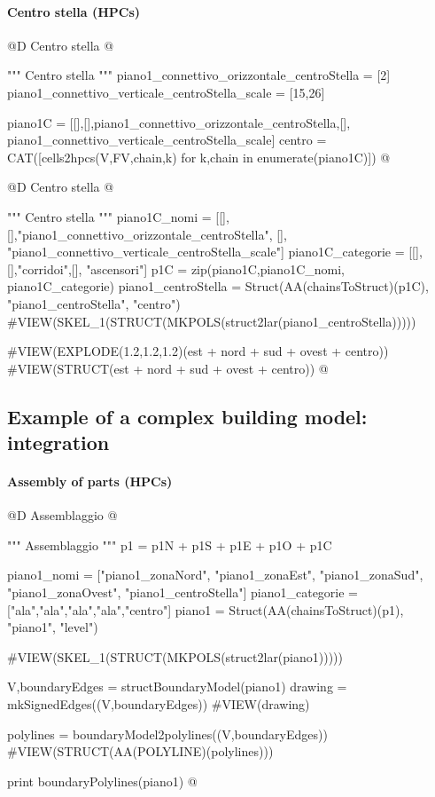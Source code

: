 \documentclass[11pt,oneside]{article}    %
\begin{document}
\paragraph{Centro stella (HPCs)}
@D Centro stella
@{""" Centro stella """
piano1_connettivo_orizzontale_centroStella = [2]
piano1_connettivo_verticale_centroStella_scale = [15,26]

piano1C = [[],[],piano1_connettivo_orizzontale_centroStella,[], piano1_connettivo_verticale_centroStella_scale]
centro = CAT([cells2hpcs(V,FV,chain,k) for k,chain in enumerate(piano1C)])
@}

@D Centro stella
@{""" Centro stella """
piano1C_nomi = [[],[],"piano1_connettivo_orizzontale_centroStella", [], "piano1_connettivo_verticale_centroStella_scale"]
piano1C_categorie = [[],[],"corridoi",[], "ascensori"]
p1C = zip(piano1C,piano1C_nomi, piano1C_categorie)
piano1_centroStella = Struct(AA(chainsToStruct)(p1C), "piano1_centroStella", "centro")
#VIEW(SKEL_1(STRUCT(MKPOLS(struct2lar(piano1_centroStella)))))

#VIEW(EXPLODE(1.2,1.2,1.2)(est + nord + sud + ovest + centro))
#VIEW(STRUCT(est + nord + sud + ovest + centro))
@}


\subsection{Example of a complex building model: integration}

\paragraph{Assembly of parts (HPCs)}
@D Assemblaggio
@{""" Assemblaggio """
p1 = p1N + p1S + p1E + p1O + p1C

piano1_nomi = ["piano1_zonaNord", "piano1_zonaEst", "piano1_zonaSud", "piano1_zonaOvest", "piano1_centroStella"]
piano1_categorie = ["ala","ala","ala","ala","centro"]
piano1 = Struct(AA(chainsToStruct)(p1), "piano1", "level")

#VIEW(SKEL_1(STRUCT(MKPOLS(struct2lar(piano1)))))

V,boundaryEdges = structBoundaryModel(piano1)
drawing = mkSignedEdges((V,boundaryEdges))
#VIEW(drawing)
        
polylines = boundaryModel2polylines((V,boundaryEdges))
#VIEW(STRUCT(AA(POLYLINE)(polylines)))
    
print boundaryPolylines(piano1)
@}
\end{document}
